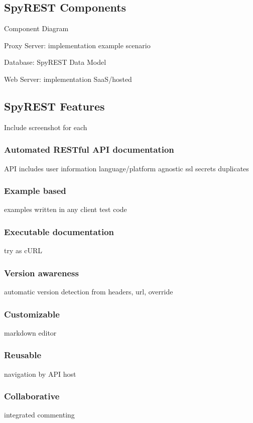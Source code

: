 \documentclass[conference]{IEEEtran}
\begin{document}
\subsection{SpyREST Components} %

Component Diagram

Proxy Server:
  implementation
  example scenario

Database:
 SpyREST Data Model

Web Server:
  implementation
  SaaS/hosted

\subsection{SpyREST Features} %

Include screenshot for each

\subsubsection{Automated RESTful API documentation }
  API
  includes user information
  language/platform agnostic
  ssl
  secrets
  duplicates

\subsubsection{Example based}
  examples written in any client
  test code

\subsubsection{Executable documentation}
  try as cURL

\subsubsection{Version awareness}
  automatic version detection from headers, url, override

\subsubsection{Customizable}
  markdown editor

\subsubsection{Reusable}
  navigation by API host

\subsubsection{Collaborative}
  integrated commenting
\end{document}
